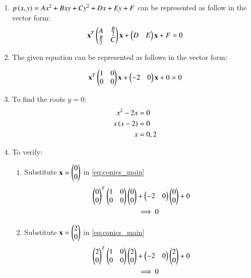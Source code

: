 \renewcommand{\theequation}{\theenumi}
\begin{enumerate}[label=\thesubsection.\arabic*.,ref=\thesubsection.\theenumi]

\item \solution $p\left(x, y\right) = Ax^2 + Bxy + Cy^2 + Dx + Ey + F$ can be represented as follow in the vector form:
\begin{align}
\mathbf{x}^T 
\begin{pmatrix}
A & \frac{B}{2} \\
\frac{B}{2} & C
\end{pmatrix}
\mathbf{x} + 
\begin{pmatrix}
D & E 
\end{pmatrix}
\mathbf{x} + F = 0
\end{align}

\item \begin{flushleft}
The given equation can be represented as follows in the vector form:
\end{flushleft}
\begin{align}
\mathbf{x}^T 
\begin{pmatrix}
1 & 0 \\
0 & 0
\end{pmatrix}
\mathbf{x} + 
\begin{pmatrix}
-2 & 0 
\end{pmatrix}
\mathbf{x} + 0 = 0 \label{eq:conics_main}
\end{align}

\item To find the roots $y=0$:
\begin{align}
x^2 - 2x &= 0 \\
x\left(x-2\right) &= 0 \\
x &= 0,2
\end{align}

\item To verify:
\begin{enumerate}
\item Substitute $\mathbf{x} = \begin{pmatrix}0\\0\end{pmatrix}$ in \ref{eq:conics_main}
\begin{align}
\begin{pmatrix}0\\0\end{pmatrix}^T 
\begin{pmatrix}
1 & 0 \\
0 & 0
\end{pmatrix}
\begin{pmatrix}0\\0\end{pmatrix} &+ 
\begin{pmatrix}
-2 & 0 
\end{pmatrix}
\begin{pmatrix}0\\0\end{pmatrix} + 0 \\
&\implies 0
\end{align}

\item  Substitute $\mathbf{x} = \begin{pmatrix}2\\0\end{pmatrix}$ in \ref{eq:conics_main}
\begin{align}
\begin{pmatrix}2\\0\end{pmatrix}^T 
\begin{pmatrix}
1 & 0 \\
0 & 0
\end{pmatrix}
\begin{pmatrix}2\\0\end{pmatrix} &+ 
\begin{pmatrix}
-2 & 0 
\end{pmatrix}
\begin{pmatrix}2\\0\end{pmatrix} + 0 \\
&\implies 0
\end{align}
\end{enumerate}


\end{enumerate}
